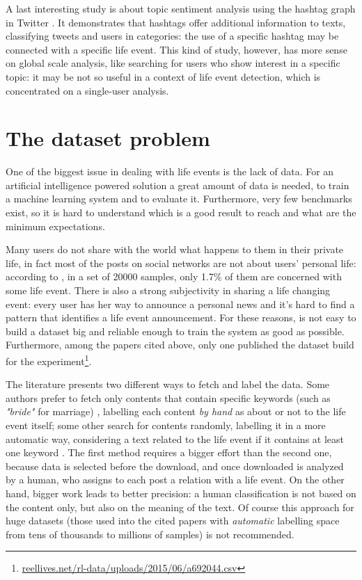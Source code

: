 A last interesting study is about topic sentiment analysis using the hashtag graph in Twitter \cite{wang2011topic}. It demonstrates that hashtags offer additional information to texts, classifying tweets and users in categories: the use of a specific hashtag may be connected with a specific life event. This kind of study, however, has more sense on global scale analysis, like searching for users who show interest in a specific topic: it may be not so useful in a context of life event detection, which is concentrated on a single-user analysis.


\section{The dataset problem}
\label{sec:dataset}
One of the biggest issue in dealing with life events is the lack of data. For an artificial intelligence powered solution a great amount of data is needed, to train a machine learning system and to evaluate it. Furthermore, very few benchmarks exist, so it is hard to understand which is a good result to reach and what are the minimum expectations.

Many users do not share with the world what happens to them in their private life, in fact most of the posts on social networks are not about users' personal life: according to \cite{moyano2015life}, in a set of 20000 samples, only 1.7\% of them are concerned with some life event. There is also a strong subjectivity in sharing a life changing event: every user has her way to announce a personal news and it's hard to find a pattern that identifies a life event announcement. For these reasons, is not easy to build a dataset big and reliable enough to train the system as good as possible. Furthermore, among the papers cited above, only one \cite{dickinson2015identifying} published the dataset build for the experiment\footnote{\url{reellives.net/rl-data/uploads/2015/06/a692044.csv}}.

The literature presents two different ways to fetch and label the data. Some authors prefer to fetch only contents that contain specific keywords (such as \emph{"bride"} for marriage) \cite{dickinson2015identifying, khobarekar2013detecting}, labelling each content \emph{by hand} as about or not to the life event itself; some other search for contents randomly, labelling it in a more automatic way, considering a text related to the life event if it contains at least one keyword \cite{choudhury2014personal, di2013detecting, moyano2015life}. The first method requires a bigger effort than the second one, because data is selected before the download, and once downloaded is analyzed by a human, who assigns to each post a relation with a life event. On the other hand, bigger work leads to better precision: a human classification is not based on the content only, but also on the meaning of the text. Of course this approach for huge datasets (those used into the cited papers with \emph{automatic} labelling space from tens of thousands to millions of samples) is not recommended. 

